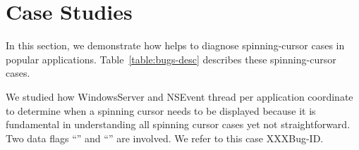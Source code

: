 \section{Case Studies}\label{sec:casestudy}

In this section, we demonstrate how \xxx helps to diagnose \nbug spinning-cursor
cases in \napps popular applications. Table~\ref{table:bugs-desc} describes
these spinning-cursor cases.

We studied how WindowsServer and NSEvent thread per application coordinate to
determine when a spinning cursor needs to be displayed because it is fundamental
in understanding all spinning cursor cases yet not straightforward. Two data
flags ``'' and ``''
are involved. We refer to this case XXXBug-ID.

